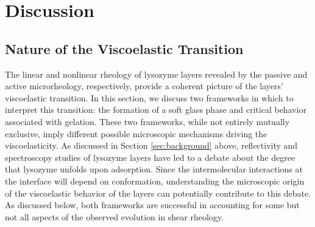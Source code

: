 \section{\label{sec:discussion}Discussion}

\subsection{Nature of the Viscoelastic Transition}

The linear and nonlinear rheology of lysozyme layers revealed by the passive and active microrheology, respectively, provide a coherent picture of the layers' viscoelastic transition.  In this section, we discuss two frameworks in which to interpret this transition:  the formation of a soft glass phase and critical behavior associated with gelation.  These two frameworks, while not entirely mutually exclusive, imply different possible microscopic mechanisms driving the viscoelasticity.  As discussed in Section \ref{sec:background} above, reflectivity and spectroscopy studies of lysozyme layers have led to a debate about the degree that lysozyme unfolds upon adsorption.  Since the intermolecular interactions at the interface will depend on conformation, understanding the microscopic origin of the viscoelastic behavior of the layers can potentially contribute to this debate.  As discussed below, both frameworks are successful in accounting for some but not all aspects of the observed evolution in shear rheology.  

